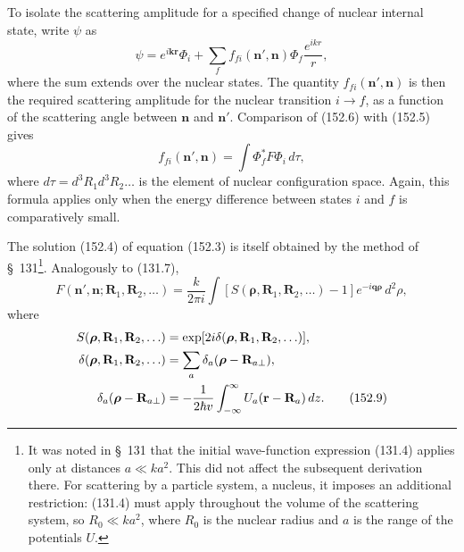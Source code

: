 To isolate the scattering amplitude for a specified change of nuclear internal state, write $\psi$ as
\begin{equation}
 \psi=e^{i\mathbf k\mathbf r}\Phi_i+\sum_f f_{fi}(\mathbf n',\mathbf n)\Phi_f\frac{e^{ikr}}r,
 \tag{152.6}
\end{equation}
where the sum extends over the nuclear states. The quantity $f_{fi}(\mathbf n',\mathbf n)$ is then the required scattering amplitude for the nuclear transition $i\to f$, as a function of the scattering angle between $\mathbf n$ and $\mathbf n'$. Comparison of (152.6) with (152.5) gives
\begin{equation}
 f_{fi}(\mathbf n',\mathbf n)=\int\Phi_f^*F\Phi_i\,d\tau,
 \tag{152.7}
\end{equation}
where $d\tau=d^3R_1d^3R_2\ldots$ is the element of nuclear configuration space. Again, this formula applies only when the energy difference between states $i$ and $f$ is comparatively small.

The solution (152.4) of equation (152.3) is itself obtained by the method of \S~131\footnote{It was noted in \S~131 that the initial wave-function expression (131.4) applies only at distances $a\ll ka^2$. This did not affect the subsequent derivation there. For scattering by a particle system, a nucleus, it imposes an additional restriction: (131.4) must apply throughout the volume of the scattering system, so $R_0\ll ka^2$, where $R_0$ is the nuclear radius and $a$ is the range of the potentials $U$.}. Analogously to (131.7),
\begin{equation}
 F(\mathbf n',\mathbf n;\mathbf R_1,\mathbf R_2,\ldots)
 =\frac{k}{2\pi i}\int[S(\boldsymbol\rho,\mathbf R_1,\mathbf R_2,\ldots)-1]
 e^{-i\mathbf q\boldsymbol\rho}\,d^2\rho,
 \tag{152.8}
\end{equation}
where
\begin{align}
 S(\boldsymbol\rho,\mathbf R_1,\mathbf R_2,\ldots)&=\exp[2i\delta(\boldsymbol\rho,\mathbf R_1,\mathbf R_2,\ldots)],\notag\\
 \delta(\boldsymbol\rho,\mathbf R_1,\mathbf R_2,\ldots)&=\sum_a\delta_a(\boldsymbol\rho-\mathbf R_{a\perp}),\notag\\
 \delta_a(\boldsymbol\rho-\mathbf R_{a\perp})&=-\frac1{2\hbar v}\int_{-\infty}^{\infty}U_a(\mathbf r-\mathbf R_a)\,dz.
 \tag{152.9}
\end{align}


